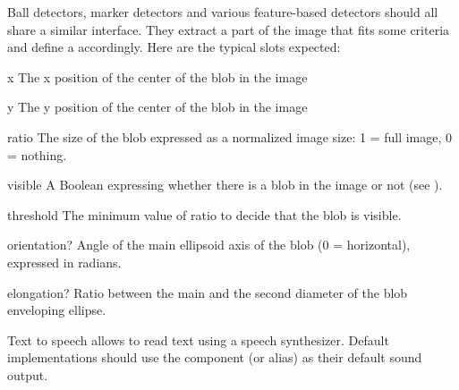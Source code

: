 
Ball detectors, marker detectors and various feature-based detectors
should all share a similar interface. They extract a part of the image
that fits some criteria and define a  accordingly. Here are
the typical slots expected:

\begin{urbiscriptapi}
\item[x] The x position of the center of the blob in the image

\item[y] The y position of the center of the blob in the image

\item[ratio] The size of the blob expressed as a normalized image size: 1 =
  full image, 0 = nothing.

\item[visible] A Boolean expressing whether there is a blob in the image or
  not (see ).

\item[threshold] The minimum value of ratio to decide that the blob is
  visible.

\item[orientation?]  Angle of the main ellipsoid axis of the blob (0 =
  horizontal), expressed in radians.

\item[elongation?]  Ratio between the main and the second diameter of the
  blob enveloping ellipse.
\end{urbiscriptapi}

Text to speech allows to read text using a speech synthesizer. Default
implementations should use the  component (or alias) as
their default sound output.

